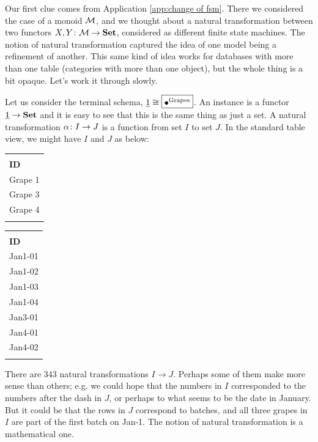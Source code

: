 Our first clue comes from Application \ref{app:change of fsm}. There we considered the case of a monoid $\mathcal{M}$, and we thought about a natural transformation between two functors $X,Y\colon\mathcal{M}\rightarrow{\bf Set}$, considered as different finite state machines. The notion of natural transformation captured the idea of one model being a refinement of another. This same kind of idea works for databases with more than one table (categories with more than one object), but the whole thing is a bit opaque. Let's work it through slowly.

\begin{example}\label{ex:nts on term}
Let us consider the terminal schema, $\underline{1}\cong\fbox{$\bullet^{\textnormal{Grapes}}$}$. An instance is a functor $\underline{1}\rightarrow{\bf Set}$ and it is easy to see that this is the same thing as just a set. A natural transformation $\alpha\colon I\rightarrow J$ is a function from set $I$ to set $J$. In the standard table view, we might have $I$ and $J$ as below:
\begin{center}
\begin{tabular}{| l ||}\bhline
\multicolumn{1}{| c |}{Grapes $(I)$}\\\bhline
{\bf ID}\\\bbhline
Grape 1\\\hline
Grape 3\\\hline
Grape 4\\\bhline
\end{tabular}
\hspace{1in}
\begin{tabular}{| l ||}\bhline
\multicolumn{1}{| c |}{Grapes $(J)$}\\\bhline
{\bf ID}\\\bbhline
Jan1-01\\\hline
Jan1-02\\\hline
Jan1-03\\\hline
Jan1-04\\\hline
Jan3-01\\\hline
Jan4-01\\\hline
Jan4-02\\\bhline
\end{tabular}
\end{center}

There are 343 natural transformations $I\to J$. Perhaps some of them make more sense than others; e.g. we could hope that the numbers in $I$ corresponded to the numbers after the dash in $J$, or perhaps to what seems to be the date in January. But it could be that the rows in $J$ correspond to batches, and all three grapes in $I$ are part of the first batch on Jan-1. The notion of natural transformation is a mathematical one.
\end{example}

